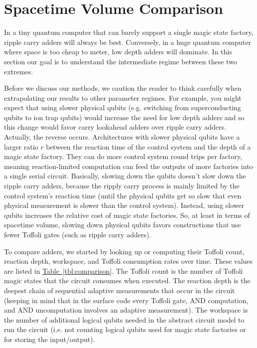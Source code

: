 \documentclass[onecolumn,unpublished]{quantumarticle}
\theoremstyle{definition}
\theoremstyle{definition}
\theoremstyle{definition}
\newcommand{\tbl}[1]{\hyperref[tbl:#1]{Table~\ref*{tbl:#1}}}
\begin{document}
\section{Spacetime Volume Comparison}
\label{sec:estimate}

In a tiny quantum computer that can barely support a single magic state factory, ripple carry adders will always be best.
Conversely, in a huge quantum computer where space is too cheap to meter, low depth adders will dominate.
In this section our goal is to understand the intermediate regime between these two extremes.

Before we discuss our methods, we caution the reader to think carefully when extrapolating our results to other parameter regimes.
For example, you might expect that using slower physical qubits (e.g. switching from superconducting qubits to ion trap qubits) would increase the need for low depth adders and so this change would favor carry lookahead adders over ripple carry adders.
Actually, the reverse occurs.
Architectures with slower physical qubits have a larger ratio $r$ between the reaction time of the control system and the depth of a magic state factory.
They can do more control system round trips per factory, meaning reaction-limited computation can feed the outputs of more factories into a single serial circuit.
Basically, slowing down the qubits doesn't slow down the ripple carry adders, because the ripply carry process is mainly limited by the control system's reaction time (until the physical qubits get so slow that even physical measurement is slower than the control system).
Instead, using slower qubits increases the relative cost of magic state factories.
So, at least in terms of spacetime volume, slowing down physical qubits favors constructions that use fewer Toffoli gates (such as ripple carry adders).

To compare adders, we started by looking up or computing their Toffoli count, reaction depth, workspace, and Toffoli consumption rates over time.
These values are listed in \tbl{comparison}.
The Toffoli count is the number of Toffoli magic states that the circuit consumes when executed.
The reaction depth is the deepest chain of sequential adaptive measurements that occur in the circuit (keeping in mind that in the surface code every Toffoli gate, AND computation, and AND uncomputation involves an adaptive measurement).
The workspace is the number of additional logical qubits needed in the abstract circuit model to run the circuit (i.e. not counting logical qubits used for magic state factories or for storing the input/output).
\end{document}
